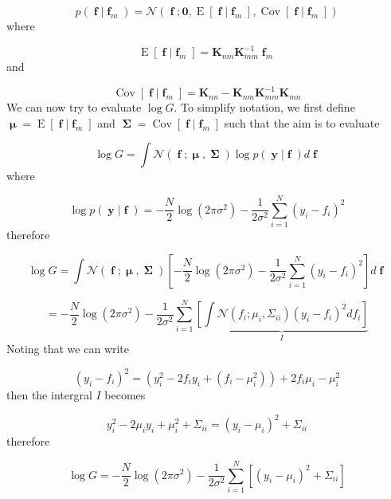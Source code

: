 \documentclass[a4paper, 11pt]{article}
\DeclareMathOperator{\Cov}{Cov}
\DeclareMathOperator{\E}{E}
\DeclareMathOperator{\y}{\boldsymbol{y}}
\DeclareMathOperator{\f}{\boldsymbol{f}}
\DeclareMathOperator{\bmu}{\boldsymbol{\mu}}
\DeclareMathOperator{\bSigma}{\boldsymbol{\Sigma}}
\begin{document}
\begin{equation}
	p(\f|\f_m) = \mathcal{N}(\f; \boldsymbol{0}, \E[\f|\f_m],\Cov[\f|\f_m])
\end{equation}
where

\begin{equation}
	\E[\f|\f_m] = \boldsymbol{K}_{nm} \boldsymbol{K}_{mm}^{-1} \f_m
\end{equation}
and

\begin{equation}
	\Cov[\f|\f_m] = \boldsymbol{K}_{nn} - \boldsymbol{K}_{nm}\boldsymbol{K}_{mm}^{-1}\boldsymbol{K}_{mn}
\end{equation}
We can now try to evaluate $\log G$. To simplify notation, we first define $\bmu = \E[\f|\f_m]$ and $\bSigma = \Cov[\f|\f_m]$ such that the aim is to evaluate

\begin{equation}
	\log G = \int \mathcal{N}(\f;\bmu,\bSigma) \log p(\y|\f) d\f
\end{equation}
where

\begin{equation}
	\log p(\y|\f) = -\frac{N}{2} \log (2\pi\sigma^2) - \frac{1}{2\sigma^2} \sum_{i=1}^N (y_i - f_i)^2
\end{equation}
therefore 

\begin{equation}
	\log G = \int \mathcal{N}(\f;\bmu,\bSigma) \left[  
		-\frac{N}{2}\log(2\pi\sigma^2) -\frac{1}{2\sigma^2} \sum_{i=1}^N (y_i-f_i)^2
	\right] d\f
\end{equation}

\begin{equation}
	= -\frac{N}{2} \log(2\pi\sigma^2) - \frac{1}{2\sigma^2} \sum_{i=1}^N \underbrace{\left[
		\int \mathcal{N}(f_i;\mu_i,\Sigma_{ii}) (y_i-f_i)^2 df_i
	\right]}_{I}
\end{equation}
Noting that we can write

\begin{equation}
	(y_i-f_i)^2 = \left( y_i^2 - 2f_i y_i + (f_i-\mu_i^2) \right) + 2f_i\mu_i - \mu_i^2
\end{equation}
then the intergral $I$ becomes

\begin{equation}
	y_i^2 - 2\mu_i y_i + \mu_i^2 + \Sigma_{ii} = (y_i-\mu_i)^2 + \Sigma_{ii}
\end{equation}
therefore

\begin{equation}
	\log G = -\frac{N}{2}\log(2\pi\sigma^2) - \frac{1}{2\sigma^2} \sum_{i=1}^N \left[ (y_i-\mu_i)^2 + \Sigma_{ii} \right]
\end{equation}
\end{document}
